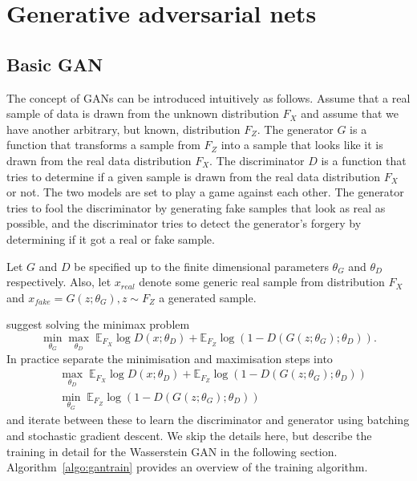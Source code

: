 \documentclass[12pt]{article}
\begin{document}
\section{Generative adversarial nets}\label{sec:gan}
\subsection{Basic GAN} 

The concept of GANs can be introduced intuitively as follows. Assume that a real sample of data is drawn from the unknown distribution $F_X$ and assume that we have another arbitrary, but known, distribution $F_Z$. The generator $G$ is a function that transforms a sample from $F_Z$ into a sample that looks like it is drawn from the real data distribution $F_X$. The discriminator $D$ is a function that tries to determine if a given sample is drawn from the real data distribution $F_X$ or not. The two models are set to play a game against each other. The generator tries to fool the discriminator by generating fake samples that look as real as possible, and the discriminator tries to detect the generator's forgery by determining if it got a real or fake sample.

Let $G$ and $D$ be specified up to the finite dimensional parameters $\theta_G$ and $\theta_D$ respectively. Also, let $x_{real}$ denote some generic real sample from distribution $F_X$ and $x_{fake} = G(z; \theta_G), z \sim F_Z$ a generated sample. 

\citet{goodfellow2014generative} suggest solving the minimax problem
\begin{equation}
\min_{\theta_G}\max_{\theta_D} \; \mathbb{E}_{F_X} \! \log D(x; \theta_D) + \mathbb{E}_{F_Z} \! \log(1 - D(G(z; \theta_G); \theta_D)).
\label{eq:basicgan}
\end{equation}
In practice \citet{goodfellow2014generative} separate the minimisation and maximisation steps into
\begin{align*}
&\max_{\theta_D} \; \mathbb{E}_{F_X} \! \log D(x; \theta_D) + \mathbb{E}_{F_Z} \! \log(1 - D(G(z; \theta_G); \theta_D)) \\
&\min_{\theta_G} \; \mathbb{E}_{F_Z} \! \log(1 - D(G(z; \theta_G); \theta_D))
\end{align*}
and iterate between these to learn the discriminator and generator using batching and stochastic gradient descent. We skip the details here, but describe the training in detail for the Wasserstein GAN in the following section. Algorithm~\ref{algo:gantrain} provides an overview of the training algorithm.
\end{document}
